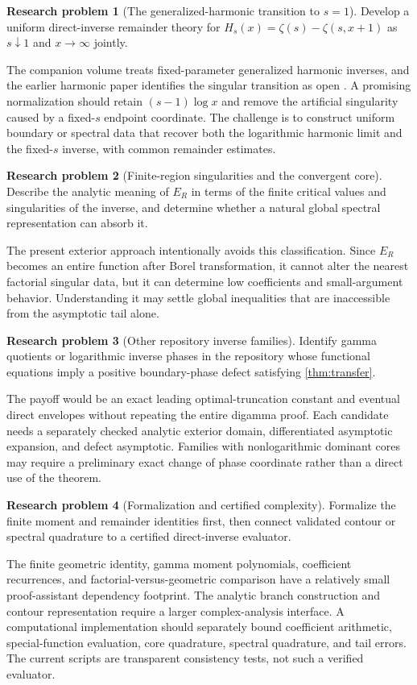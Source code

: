 \documentclass[11pt,a4paper]{article}
\theoremstyle{definition}
\newtheorem{problem}{Research problem}
\numberwithin{equation}{section}
\begin{document}
\begin{problem}[The generalized-harmonic transition to $s=1$]
Develop a uniform direct-inverse remainder theory for
$H_s(x)=\zeta(s)-\zeta(s,x+1)$ as $s\downarrow1$ and $x\to\infty$ jointly.
\end{problem}
The companion volume treats fixed-parameter generalized harmonic inverses, and the earlier harmonic paper identifies the singular transition as open \cite{companion,prior}. A promising normalization should retain $(s-1)\log x$ and remove the artificial singularity caused by a fixed-$s$ endpoint coordinate. The challenge is to construct uniform boundary or spectral data that recover both the logarithmic harmonic limit and the fixed-$s$ inverse, with common remainder estimates.

\begin{problem}[Finite-region singularities and the convergent core]
Describe the analytic meaning of $E_R$ in terms of the finite critical values and singularities of the inverse, and determine whether a natural global spectral representation can absorb it.
\end{problem}
The present exterior approach intentionally avoids this classification. Since $E_R$ becomes an entire function after Borel transformation, it cannot alter the nearest factorial singular data, but it can determine low coefficients and small-argument behavior. Understanding it may settle global inequalities that are inaccessible from the asymptotic tail alone.

\begin{problem}[Other repository inverse families]
Identify gamma quotients or logarithmic inverse phases in the repository whose functional equations imply a positive boundary-phase defect satisfying \cref{thm:transfer}.
\end{problem}
The payoff would be an exact leading optimal-truncation constant and eventual direct envelopes without repeating the entire digamma proof. Each candidate needs a separately checked analytic exterior domain, differentiated asymptotic expansion, and defect asymptotic. Families with nonlogarithmic dominant cores may require a preliminary exact change of phase coordinate rather than a direct use of the theorem.

\begin{problem}[Formalization and certified complexity]
Formalize the finite moment and remainder identities first, then connect validated contour or spectral quadrature to a certified direct-inverse evaluator.
\end{problem}
The finite geometric identity, gamma moment polynomials, coefficient recurrences, and factorial-versus-geometric comparison have a relatively small proof-assistant dependency footprint. The analytic branch construction and contour representation require a larger complex-analysis interface. A computational implementation should separately bound coefficient arithmetic, special-function evaluation, core quadrature, spectral quadrature, and tail errors. The current scripts are transparent consistency tests, not such a verified evaluator.
\end{document}
